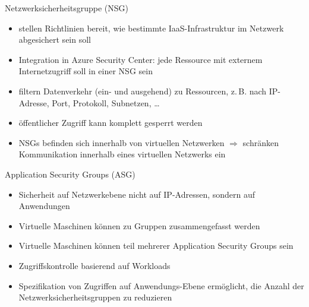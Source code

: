 
\begin{flashcard}[Definition]{Netzwerksicherheitsgruppe (NSG)}
    \begin{itemize}
        \item stellen Richtlinien bereit, wie bestimmte IaaS-Infrastruktur im Netzwerk abgesichert sein soll
        \item Integration in Azure Security Center: jede Ressource mit externem Internetzugriff soll in einer NSG sein
        \item filtern Datenverkehr (ein- und ausgehend) zu Ressourcen, z.\,B. nach IP-Adresse, Port, Protokoll, Subnetzen, \ldots
        \item öffentlicher Zugriff kann komplett gesperrt werden
        \item NSGs befinden sich innerhalb von virtuellen Netzwerken\newline
        $\Rightarrow$ schränken Kommunikation innerhalb eines virtuellen Netzwerks ein
    \end{itemize}

\end{flashcard}

\begin{flashcard}[Describe]{Application Security Groups (ASG)}
    \begin{itemize}
        \item Sicherheit auf Netzwerkebene nicht auf IP-Adressen, sondern auf Anwendungen
        \item Virtuelle Maschinen können zu Gruppen zusammengefasst werden
        \item Virtuelle Maschinen können teil mehrerer Application Security Groups sein
        \item Zugriffskontrolle basierend auf Workloads
        \item Spezifikation von Zugriffen auf Anwendungs-Ebene ermöglicht, die Anzahl der Netzwerksicherheitsgruppen zu reduzieren
    \end{itemize}
\end{flashcard}

